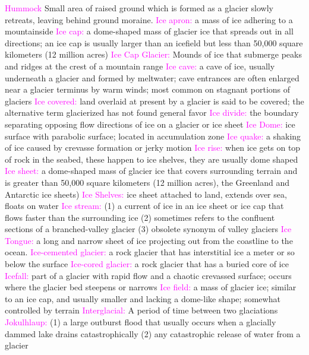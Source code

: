 \documentclass{article}
\newcommand{\pink}[1]{\textcolor{magenta}{#1}}
\newcommand{\vocab}[1]{{\pink{#1}}}
\begin{document}
\begin{multicols*}{4}
		\vocab{Hummock} Small area of raised ground which is formed as a glacier slowly retreats, leaving behind ground moraine.  
		\vocab{        Ice apron: } a mass of ice adhering to a mountainside 
		\vocab{        Ice cap: } a dome-shaped mass of glacier ice that spreads out in all directions; an ice cap is usually larger than an icefield but less than 50,000 square kilometers (12 million acres) 
		\vocab{Ice Cap Glacier: } Mounds of ice that submerge peaks and ridges at the crest of a mountain range  
		\vocab{        Ice cave: } a cave of ice, usually underneath a glacier and formed by meltwater; cave entrances are often enlarged near a glacier terminus by warm winds; most common on stagnant portions of glaciers 
		\vocab{        Ice covered: } land overlaid at present by a glacier is said to be covered; the alternative term glacierized has not found general favor 
		\vocab{        Ice divide: } the boundary separating opposing flow directions of ice on a glacier or ice sheet 
		\vocab{        Ice Dome: } ice surface with parabolic surface; located in accumulation zone   
		\vocab{        Ice quake: } a shaking of ice caused by crevasse formation or jerky motion 
		\vocab{Ice rise: } when ice gets on top of rock in the seabed, these happen to ice shelves, they are usually dome shaped  
		\vocab{        Ice sheet: } a dome-shaped mass of glacier ice that covers surrounding terrain and is greater than 50,000 square kilometers (12 million acres), the Greenland and Antarctic ice sheets) 
		\vocab{ Ice Shelves: }ice sheet attached to land, extends over sea, floats on water 
		\vocab{        Ice stream: } (1) a current of ice in an ice sheet or ice cap that flows faster than the surrounding ice (2) sometimes refers to the confluent sections of a branched-valley glacier (3) obsolete synonym of valley glaciers 
		\vocab{Ice Tongue: } a long and narrow sheet of ice projecting out from the coastline to the ocean.  
		\vocab{        Ice-cemented glacier: } a rock glacier that has interstitial ice a meter or so below the surface 
		\vocab{        Ice-cored glacier: } a rock glacier that has a buried core of ice
		\vocab{        Icefall: } part of a glacier with rapid flow and a chaotic crevassed surface; occurs where the glacier bed steepens or narrows 
		\vocab{        Ice field: } a mass of glacier ice; similar to an ice cap, and usually smaller and lacking a dome-like shape; somewhat controlled by terrain 
		\vocab{Interglacial: } A period of time between two glaciations  
		\vocab{        Jokulhlaup: } (1) a large outburst flood that usually occurs when a glacially dammed lake drains catastrophically (2) any catastrophic release of water from a glacier 

\end{multicols*}
\end{document}
